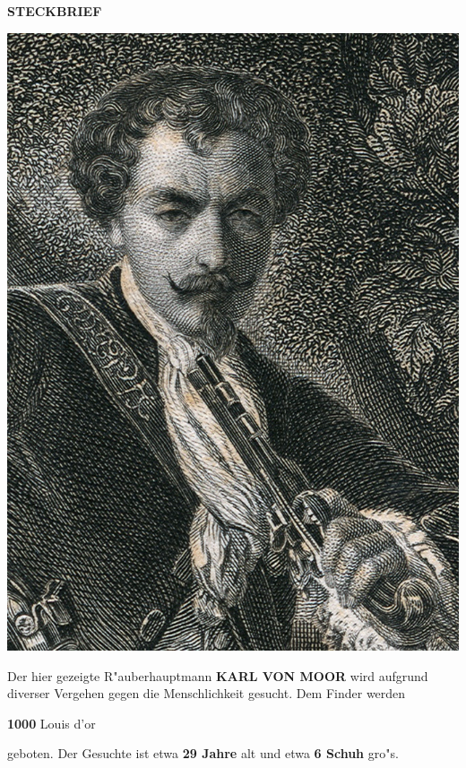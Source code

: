 \begin{center}
\begin{huge}
\textbf{\uppercase{Steckbrief}}
\end{huge}
\end{center}

\begin{center}
\includegraphics[scale=2.5]{karl}
\end{center}

\begin{center}
Der hier gezeigte  R"auberhauptmann \textbf{\uppercase{Karl von Moor}} wird aufgrund diverser Vergehen gegen die Menschlichkeit gesucht. Dem Finder werden
\end{center}

\begin{center}
\begin{huge}
\textbf{1000} Louis d'or
\end{huge}
\end{center}

\begin{center}
geboten. Der Gesuchte ist etwa \textbf{29 Jahre} alt und etwa \textbf{6 Schuh} gro"s.
\end{center}